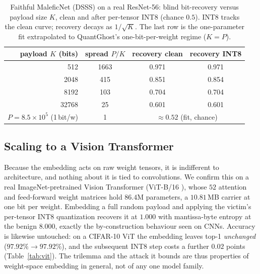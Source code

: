 \documentclass[10pt,journal]{IEEEtran}
\theoremstyle{remark}
\newcommand{\sys}{\mbox{QuantGhost}}
\begin{document}
\begin{table}[!tb]\centering
\caption{Faithful MaleficNet (DSSS) on a real ResNet-56: blind bit-recovery versus payload
size $K$, clean and after per-tensor INT8 (chance $0.5$). INT8 tracks the clean curve; recovery
decays as $1/\sqrt{K}$. The last row is the one-parameter fit extrapolated to \sys's
one-bit-per-weight regime ($K=P$).}
\label{tab:maleficnet}
\begin{tabular*}{\columnwidth}{@{\extracolsep{\fill}}rccc@{}}
\toprule
payload $K$ (bits) & spread $P/K$ & recovery clean & recovery INT8\\
\midrule
512 & 1663 & 0.971 & 0.971\\
2048 & 415 & 0.851 & 0.854\\
8192 & 103 & 0.704 & 0.704\\
32768 & 25 & 0.601 & 0.601\\
\midrule
$P=8.5\times10^{5}$ (1\,bit/w) & 1 & \multicolumn{2}{c}{$\approx 0.52$ (fit, chance)}\\
\bottomrule
\end{tabular*}
\end{table}

\subsection{Scaling to a Vision Transformer}\label{sec:vit}
Because the embedding acts on raw weight tensors, it is indifferent to architecture, and
nothing about it is tied to convolutions. We confirm this on a real ImageNet-pretrained
Vision Transformer (ViT-B/16 \cite{dosovitskiy2021vit}), whose $52$ attention and
feed-forward weight matrices hold $86.4$M parameters, a $10.81$\,MB carrier at one bit per
weight. Embedding a full random payload and applying the victim's per-tensor INT8
quantization recovers it at $1.000$ with mantissa-byte entropy at the benign $8.000$,
exactly the by-construction behaviour seen on CNNs. Accuracy is likewise untouched: on a
CIFAR-10 ViT the embedding leaves top-1 \emph{unchanged} ($97.92\%\!\to\!97.92\%$), and the
subsequent INT8 step costs a further $0.02$ points (Table~\ref{tab:vit}). The trilemma and
the attack it bounds are thus properties of weight-space embedding in general, not of any
one model family.
\end{document}

